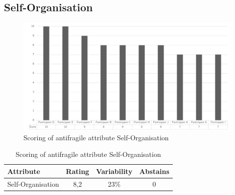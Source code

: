 \subsection{Self-Organisation}
\begin{figure}[h!]
	\centering
	\includegraphics[width=0.9\linewidth]{images/scoreafselforganisation}
	\caption[Scoring of antifragile attribute Self-Organisation]{Scoring of antifragile attribute Self-Organisation}
	\label{fig:appscoringafselforganisation}
\end{figure}
\begin{table}[h!]
	\centering
	\begin{tabular}{p{}ccc}
		\toprule
		\textbf{Attribute} & \textbf{Rating} & \textbf{Variability} & \textbf{Abstains} \\
		\midrule
		Self-Organisation & 8,2 & 23\% & 0 \\%
		\bottomrule
	\end{tabular}%
	\caption[Scoring of antifragile attribute Self-Organisation]{Scoring of antifragile attribute Self-Organisation}
	\label{tab:appscoringafselforganisation}%
\end{table}%
\newpage
